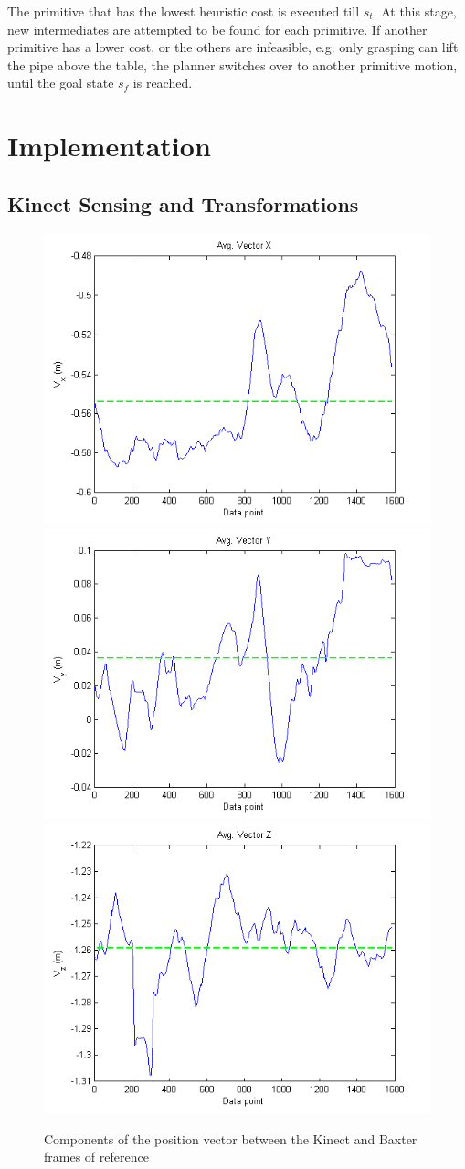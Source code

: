 \documentclass[runningheads,letterpaper]{llncs}
\begin{document}
The primitive that has the lowest heuristic cost is executed till $s_t$. At this stage, new intermediates are attempted to be found for each primitive. If another primitive has a lower cost, or the others are infeasible, e.g. only grasping can lift the pipe above the table, the planner switches over to another primitive motion, until the goal state $s_f$ is reached.


\section{Implementation}

\subsection{Kinect Sensing and Transformations}

\begin{figure}[ht]
\centering
	\includegraphics[height=0.35\columnwidth]{images/vec_avg_x.png}
	\includegraphics[height=0.35\columnwidth]{images/vec_avg_y.png}
	\includegraphics[height=0.35\columnwidth]{images/vec_avg_z.png}
\caption{Components of the position vector between the Kinect and Baxter frames of reference}
\label{fig:kinect_to_baxter}
\end{figure}
\end{document}
